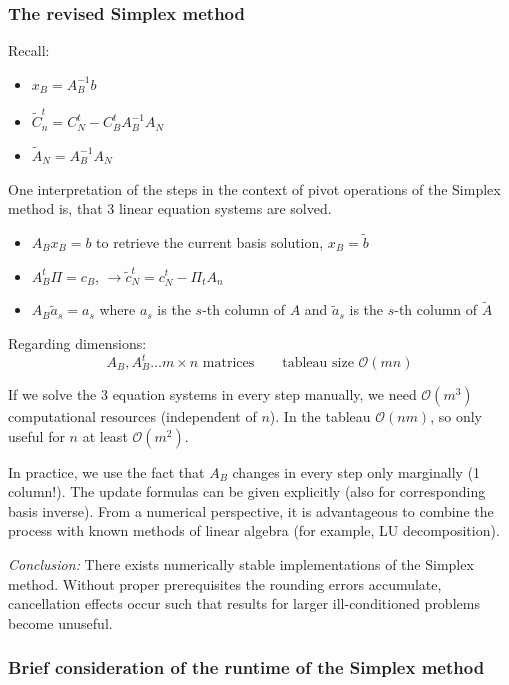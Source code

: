 \documentclass[a4paper]{article}
\numberwithin{lecref}{subsection}
\begin{document}
\subsubsection{The revised Simplex method}
\label{section:3.3}

Recall:
\begin{itemize}
	\item $x_B = A_B^{-1} b$
	\item $\tilde C^t_n = C_N^t - C_B^t A_B^{-1} A_N$
	\item $\tilde A_N = A_B^{-1} A_N$
\end{itemize}

One interpretation of the steps in the context of pivot operations of the Simplex method is, that 3 linear equation systems are solved.

\begin{itemize}
	\item $A_B x_B = b$ to retrieve the current basis solution, $x_B = \tilde b$
	\item $A_B^t \Pi = c_B$, $\to \tilde c_N^t = c_N^t - \Pi_t A_n$
	\item $A_B \tilde a_s = a_s$ where $a_s$ is the $s$-th column of $A$ and $\tilde a_s$ is the $s$-th column of $\tilde A$
\end{itemize}

Regarding dimensions:
\[ A_B, A_B^t \dots m \times n \text{ matrices} \qquad \text{tableau size } \mathcal{O}(mn) \]

If we solve the 3 equation systems in every step manually, we need $\mathcal O(m^3)$ computational resources (independent of $n$).
In the tableau $\mathcal O(nm)$, so only useful for $n$ at least $\mathcal O(m^2)$.

In practice, we use the fact that $A_B$ changes in every step only marginally (1 column!). The update formulas can be given explicitly (also for corresponding basis inverse).
From a numerical perspective, it is advantageous to combine the process with known methods of linear algebra (for example, LU decomposition).

\emph{Conclusion:} There exists numerically stable implementations of the Simplex method.
Without proper prerequisites the rounding errors accumulate, cancellation effects occur such that results for larger ill-conditioned problems become unuseful.

\subsubsection{Brief consideration of the runtime of the Simplex method}
\label{section:3.4}
\end{document}
